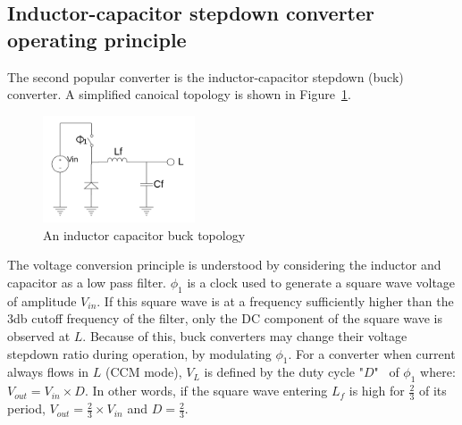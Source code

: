 \documentclass[letterpaper,twocolumn,10pt]{article}
\begin{document}
\subsection{Inductor-capacitor stepdown converter operating principle}

The second popular converter is the inductor-capacitor stepdown (buck) converter. A simplified canoical topology is shown in Figure~\ref{BKTopology}.\\
\begin{figure}[here]
\includegraphics[width=0.4\textwidth]{BKTopology}
\caption{An inductor capacitor buck topology}
\label{BKTopology}
\end{figure}

The voltage conversion principle is understood by considering the inductor and capacitor as a low pass filter. $\phi_1$ is a clock used to generate a square wave voltage of amplitude $V_{in}$. If this square wave is at a frequency sufficiently higher than the 3db cutoff frequency of the filter, only the DC component of the square wave is observed at $L$. Because of this, buck converters may change their voltage stepdown ratio during operation, by modulating $\phi_1$. For a converter when current always flows in $L$ (CCM mode), $V_L$ is defined by the duty cycle "$D$"~\cite{Kurson2006} of $\phi_1$ where: $V_{out} = V_{in} \times D$. In other words, if the square wave entering $L_f$ is high for $\frac{2}{3}$ of its period, $V_{out} = \frac{2}{3}\times V_{in}$ and $D = \frac{2}{3}$.\\ 
\end{document}
